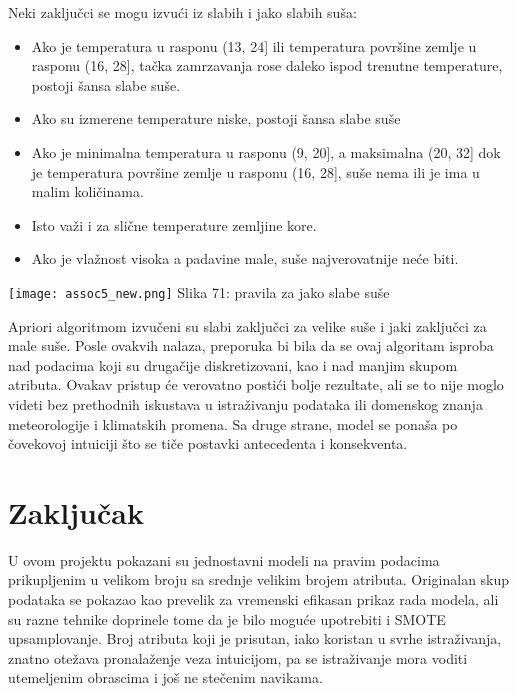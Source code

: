 \documentclass[a4paper]{article}
\begin{document}
{Neki zaključci se mogu izvući iz slabih i jako slabih suša:
\begin{itemize}
\item Ako je temperatura u rasponu (13, 24] ili temperatura površine zemlje u rasponu (16, 28], tačka zamrzavanja rose daleko ispod trenutne temperature, postoji šansa slabe suše.
\item Ako su izmerene temperature niske, postoji šansa slabe suše
\item Ako je minimalna temperatura u rasponu (9, 20], a maksimalna (20, 32] dok je temperatura površine zemlje u rasponu (16, 28], suše nema ili je ima u malim količinama.
\item Isto važi i za slične temperature zemljine kore.
\item Ako je vlažnost visoka a padavine male, suše najverovatnije neće biti.\\
\end{itemize}

\noindent\begin{minipage}{1.0\textwidth}
\texttt{[image: assoc5\_new.png]}
\hphantom{aaaaaaaaaaaaaaaaaaaa}Slika 71: pravila za jako slabe suše\\
\end{minipage}

Apriori algoritmom izvučeni su slabi zaključci za velike suše i jaki zaključci za male suše. Posle ovakvih nalaza, preporuka bi bila da se ovaj algoritam isproba nad podacima koji su drugačije diskretizovani, kao i nad manjim skupom atributa. Ovakav pristup će verovatno postići bolje rezultate, ali se to nije moglo videti bez prethodnih iskustava u istraživanju podataka ili domenskog znanja meteorologije i klimatskih promena. Sa druge strane, model se ponaša po čovekovoj intuiciji što se tiče postavki antecedenta i konsekventa.

\section{Zaključak}
\label{sec:zakljucak}

U ovom projektu pokazani su jednostavni modeli na pravim podacima prikupljenim u velikom broju sa srednje velikim brojem atributa. Originalan skup podataka se pokazao kao prevelik za vremenski efikasan prikaz rada modela, ali su razne tehnike doprinele tome da je bilo moguće upotrebiti i SMOTE upsamplovanje. Broj atributa koji je prisutan, iako koristan u svrhe istraživanja, znatno otežava pronalaženje veza intuicijom, pa se istraživanje mora voditi utemeljenim obrascima i još ne stečenim navikama.\\

}
\end{document}
